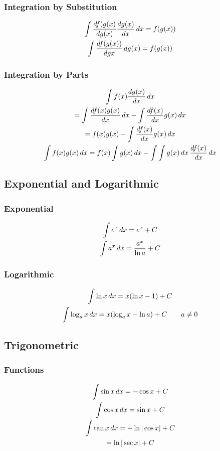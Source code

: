 \documentclass[12pt]{article}
\numberwithin{equation}{subsubsection}
\begin{document}
			\subsubsection{Integration by Substitution}
				\begin{gather}
					\integral{\derivative[g(x)]{f(g(x)}\derivative{g(x)}}
					= f(g(x)) \\
					\int
					\derivative[g{x}]{f(g(x))}\,dg(x) =
					f(g(x))
				\end{gather}
			\subsubsection{Integration by Parts}
				\begin{gather}
					\integral{f(x)\derivative{g(x)}} \\
					= \integral{\derivative{f(x)g(x)}} -
					\integral{\derivative{f(x)}g(x)} \\
					= f(x)g(x) - \integral{\derivative{f(x)}g(x)}
					\\
					\integral{f(x)g(x)} = f(x)\integral{g(x)}
					- \integral{\integral{g(x)}\,\derivative{f(x)}}
				\end{gather}
		\subsection{Exponential and Logarithmic}
			\subsubsection{Exponential}
				\begin{gather}
					\integral{e^x} = e^x + C \\
					\integral{a^x} = \frac{a^x}{\ln a} + C
				\end{gather}
			\subsubsection{Logarithmic}
				\begin{gather}
					\integral{\ln x} = x(\ln x - 1) + C \\
					\integral{\log_ax} = x(\log_ax - \ln a) +
					C \qquad a \neq 0
				\end{gather}
		\subsection{Trigonometric}
			\subsubsection{Functions}
				\begin{gather}
					\integral{\sin x} = -\cos x + C \\
					\integral{\cos x} = \sin x + C \\
					\integral{\tan x} = -\ln |\cos x| + C \\
					= \ln |\sec x| + C
				\end{gather}
\end{document}
